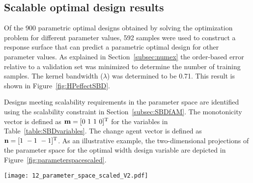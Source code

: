 \subsection{Scalable optimal design results} \label{subsec:scalabledesignspace}

Of the 900 parametric optimal designs obtained by solving the optimization problem for different parameter values, 592 samples were used to construct a response surface that can predict a parametric optimal design for other parameter values. As explained in Section~\ref{subsec:numex} the order-based error relative to a validation set was minimized to determine the number of training samples. The kernel bandwidth ($\lambda$) was determined to be 0.71. This result is shown in Figure~\ref{fig:HPeffectSBD}.

Designs meeting scalability requirements in the parameter space are identified using the scalability constraint in Section~\ref{subsec:SBDfAM}. The monotonicity vector is defined as $\mathbf{m} = [0~1~1~0]^{\text T}$ for the variables in Table~\ref{table:SBDvariables}. The {change agent} vector is defined as $\mathbf{n} = [1~-1~-1]^{\text T}$. As an illustrative example, the two-dimensional projections of the parameter space for the optimal width design variable are depicted in Figure~\ref{fig:parameterspacescaled}.
\begin{figure*}%
	\centering
	\texttt{[image: 12\_parameter\_space\_scaled\_V2.pdf]} %
	\caption{ \label{fig:parameterspacescaled} Projections of the optimal width design variable $\hat{x_3}^{*}$ with non-scalable regions of the parameter space hatched}
\end{figure*}
\begin{figure*}[h!]
	\centering
	 \hspace{0.02\textwidth}%
	\caption{Effect of number of training points and kernel bandwidth on order-based error}
	\label{fig:HPeffectSBD}
\end{figure*}

